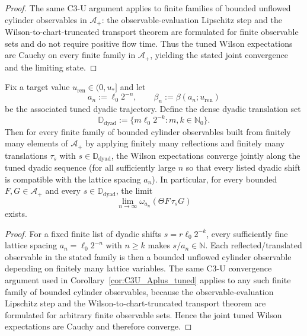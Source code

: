 \begin{proof}
The same C3-U argument applies to finite families of bounded unflowed cylinder observables in $\mathcal A_+$: the observable-evaluation Lipschitz step and the Wilson-to-chart-truncated transport theorem are formulated for finite observable sets and do not require positive flow time.
Thus the tuned Wilson expectations are Cauchy on every finite family in $\mathcal A_+$, yielding the stated joint convergence and the limiting state.
\end{proof}

\begin{corollary}\label{cor:C3U_reflected_tuned}
Fix a target value $u_{\mathrm{ren}}\in(0,u_\ast]$ and let
\[
a_n:=\ell_0 2^{-n},\qquad \beta_n:=\beta(a_n;u_{\mathrm{ren}})
\]
be the associated tuned dyadic trajectory.
Define the dense dyadic translation set
\[
\mathbb D_{\mathrm{dyad}}:=\{m\ell_0 2^{-k}:m,k\in\mathbb N_0\}.
\]
Then for every finite family of bounded cylinder observables built from finitely many elements of $\mathcal A_+$ by applying finitely many reflections and finitely many translations $\tau_s$ with $s\in\mathbb D_{\mathrm{dyad}}$, the Wilson expectations converge jointly along the tuned dyadic sequence (for all sufficiently large $n$ so that every listed dyadic shift is compatible with the lattice spacing $a_n$).
In particular, for every bounded $F,G\in\mathcal A_+$ and every $s\in\mathbb D_{\mathrm{dyad}}$, the limit
\[
\lim_{n\to\infty}\omega_{a_n}(\Theta F\,\tau_s G)
\]
exists.
\end{corollary}

\begin{proof}
For a fixed finite list of dyadic shifts $s=r\ell_0 2^{-k}$, every sufficiently fine lattice spacing $a_n=\ell_0 2^{-n}$ with $n\ge k$ makes $s/a_n\in\mathbb N$.
Each reflected/translated observable in the stated family is then a bounded unflowed cylinder observable depending on finitely many lattice variables.
The same C3-U convergence argument used in Corollary~\ref{cor:C3U_Aplus_tuned} applies to any such finite family of bounded cylinder observables, because the observable-evaluation Lipschitz step and the Wilson-to-chart-truncated transport theorem are formulated for arbitrary finite observable sets.
Hence the joint tuned Wilson expectations are Cauchy and therefore converge.
\end{proof}

